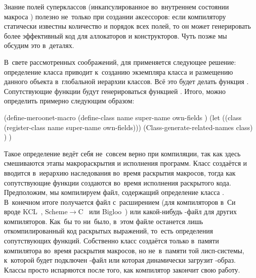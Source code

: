 Знание полей суперклассов (инкапсулированное во~внутреннем состоянии макроса
) полезно не~только при создании аксессоров: если компилятору
статически известны количество и порядок всех полей, то он может генерировать
более эффективный код для аллокаторов и конструкторов. Чуть позже мы обсудим
это в~деталях.

В~свете рассмотренных соображений, для {\Meroonet} применяется следующее
решение: определение класса приводит к~созданию экземпляра класса  и
размещению данного объекта в~глобальной иерархии классов. Всё это будет делать
функция . Сопутствующие функции будут генерироваться функцией
. Итого,  можно определить
примерно следующим образом:

\begin{code:lisp}
(define-meroonet-macro (define-class name super-name
                                     own-fields )
  (let ((class (register-class name super-name own-fields)))
    (Class-generate-related-names class) ) )
\end{code:lisp}

Такое определение ведёт себя не~совсем верно при компиляции, так как здесь
смешиваются этапы макрораскрытия и исполнения программ. Класс создаётся и
вводится в~иерархию наследования во~время раскрытия макросов, тогда как
сопутствующие функции создаются во~время исполнения раскрытого кода.
Предположим, мы компилируем файл, содержащий определение класса .
В~конечном итоге получается файл с~расширением  (для компиляторов в~Си
вроде KCL~\cite{yh85}, Scheme$\to$C~\cite{bar89} или Bigloo~\cite{ser94}) или
какой-нибудь -файл для других компиляторов. Как~бы то ни~было, в~этом
файле останется лишь откомпилированный код раскрытых выражений, то~есть
определения сопутствующих функций. Собственно класс создаётся только в~памяти
компилятора во~время раскрытия макросов, но не~в~памяти той лисп-системы,
к~которой будет подключен -файл или которая динамически загрузит
-образ. Классы просто испаряются после того, как компилятор закончит
свою работу.

